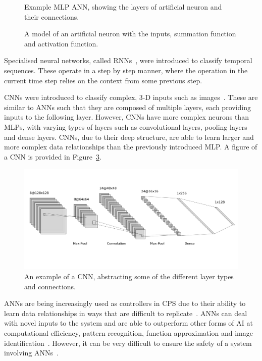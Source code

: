 \begin{figure}[h]
	\centering
	\scalebox{0.8}{}
	\caption{Example \ac{MLP} \ac{ANN}, showing the layers of artificial neuron and their connections.	\label{fig:mlp-ann}}
\end{figure}
\begin{figure}[h]
	\centering
	\scalebox{0.8}{}
	\caption{A model of an artificial neuron with the inputs, summation function and activation function. \label{fig:artificial-neuron}}
\end{figure}

Specialised neural networks, called \acfp{RNN}~\cite{medsker2001recurrent}, were introduced to classify temporal sequences. 
These operate in a step by step manner, where the operation in the current time step relies on the context from some previous step.

\acp{CNN} were introduced to classify complex, 3-D inputs such as images~\cite{grad-desc}.
These are similar to \acp{ANN} such that they are composed of multiple layers, each providing inputs to the following layer. 
However, \acp{CNN} have more complex neurons than \acp{MLP}, with varying types of layers such as convolutional layers, pooling layers and dense layers.
\acp{CNN}, due to their deep structure, are able to learn larger and more complex data relationships than the previously introduced \ac{MLP}.
A figure of a \ac{CNN} is provided in Figure~\ref{fig:cnn}.

\begin{figure}[h]
	\centering
	\includegraphics[width=\textwidth]{Content/fig/cnn-img.pdf}
	\caption{An example of a \ac{CNN}, abstracting some of the different layer types and connections. \label{fig:cnn}}
\end{figure}

\acp{ANN} are being increasingly used as controllers in \ac{CPS} due to their ability to learn data relationships in ways that are difficult to replicate~\cite{ANNSafety2007}. 
\acp{ANN} can deal with novel inputs to the system and are able to outperform other forms of \ac{AI} at computational efficiency, pattern recognition, function approximation and image identification~\cite{AIComp2017, AIComp2016}. 
However, it can be very difficult to ensure the safety of a system involving \acp{ANN}~\cite{ANNSafety2018, ANNSafety2007}.

